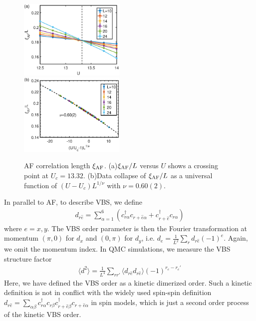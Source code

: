 \documentclass[twocolumn,superscriptaddress]{revtex4-1}
\begin{document}
\begin{figure}
	\includegraphics[width=0.45\textwidth]{correlationlength_af}\\
	\includegraphics[width=0.45\textwidth]{datacollapse_xi}
	\caption{\label{fig:correlationlength_af} AF correlation length $\xi_{\rm AF}$. (a)$\xi_{\rm AF}/L$ versus $U$ shows a crossing point at $U_c=13.32$. (b)Data collapse of $\xi_{\rm AF}/L$ as a universal function of $(U-U_c)L^{1/\nu}$ with $\nu=0.60(2)$.}
\end{figure}


In parallel to AF, to describe VBS, we define
\begin{eqnarray}
  d_{r\hat{e}}=\sum_{\alpha=1}^{6}\left(c_{r\alpha}^\dag c_{r+\hat{e}\alpha} + c_{r+\hat{e}}^\dag c_{r\alpha} \right)
\end{eqnarray}
where $e=x,y$. The VBS order parameter is then the Fourier transformation at momentum $(\pi,0)$ for $d_x$ and $(0,\pi)$ for $d_y$, i.e. $d_e=\frac{1}{L^2}\sum_r d_{r\hat{e}}(-1)^e$. Again, we omit the momentum index. In QMC simulations, we measure the VBS structure factor 
\begin{eqnarray}
  \langle d^2 \rangle=\frac{1}{L^4}\sum_{rr'} \langle d_{r\hat{e}}d_{r\hat{e}}\rangle (-1)^{r_e-r_e'}
\end{eqnarray}
Here, we have defined the VBS order as a kinetic dimerized order. Such a kinetic definition is not in conflict with the widely used spin-spin definition $d_{r\hat{e}}=\sum_{\alpha\beta}c_{r\alpha}^\dag c_{r\beta} c_{r+\hat{e}\beta}^\dag c_{r+\hat{e}\alpha}$ in spin models, which is just a second order process of the kinetic VBS order.
\end{document}
